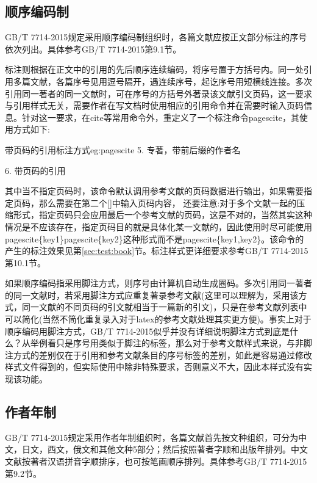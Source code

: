 \documentclass[11pt]{article} %
\newcommand{\qd}[1]{%
{\fangsong\color{blue}#1}}
\begin{document}
\subsection{顺序编码制}

GB/T 7714-2015规定采用顺序编码制组织时，各篇文献应按正文部分标注的序号依次列出。具体参考GB/T 7714-2015第9.1节。

标注则根据在正文中的引用的先后顺序连续编码，将序号置于方括号内。同一处引用多篇文献，各篇序号见用逗号隔开，遇连续序号，起讫序号用短横线连接。多次引用同一著者的同一文献时，可在序号的方括号外著录该文献引文页码，这一要求与引用样式无关，需要作者在写文档时使用相应的引用命令并在需要时输入页码信息。针对这一要求，在cite等常用命令外，重定义了一个标注命令pagescite，其使用方式如下:

\begin{codetex}{带页码的引用标注方式}{eg:pagescite}
5. 专著，带前后缀的作者名\cite{Peebles2001-100-100}

6. 带页码的引用
\end{codetex}

其中当不指定页码时，该命令默认调用参考文献的页码数据进行输出，如果需要指定页码，那么需要在第二个[]中输入页码内容，\qd{还要注意:对于多个文献一起的压缩形式，指定页码只会应用最后一个参考文献的页码，这是不对的，当然其实这种情况是不应该存在，指定页码目的就是具体化某一文献的，因此使用时尽可能使用pagescite\{key1\}pagescite\{key2\}这种形式而不是pagescite\{key1,key2\}}。该命令的产生的标注效果见第\ref{sec:test:book}节。标注样式更详细要求参考GB/T 7714-2015 第10.1节。

如果顺序编码指采用脚注方式，则序号由计算机自动生成圈码。多次引用同一著者的同一文献时，若采用脚注方式应重复著录参考文献(这里可以理解为，采用该方式，同一文献的不同页码的引文就相当于一篇新的引文)，只是在参考文献列表中可以简化(当然不简化重复录入对于latex的参考文献处理其实更方便)。事实上对于顺序编码用脚注方式，GB/T 7714-2015似乎并没有详细说明脚注方式到底是什么？从举例看只是序号用类似于脚注的标签，那么对于参考文献样式来说，与非脚注方式的差别仅在于引用和参考文献条目的序号标签的差别，如此是容易通过修改样式文件得到的，但实际使用中除非特殊要求，否则意义不大，因此本样式没有实现该功能。

\subsection{作者年制}

GB/T 7714-2015规定采用作者年制组织时，各篇文献首先按文种组织，可分为中文，日文，西文，俄文和其他文种5部分；然后按照著者字顺和出版年排列。中文文献按著者汉语拼音字顺排序，也可按笔画顺序排列。具体参考GB/T 7714-2015第9.2节。
\end{document}

